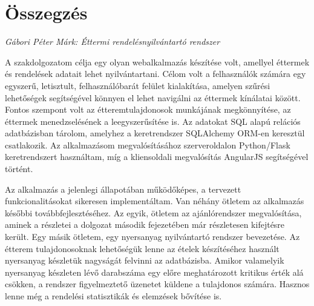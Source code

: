 \documentclass[a4paper,12pt]{article}
\begin{document}
\pagestyle{empty}

\section*{Összegzés}

\textit{Gábori Péter Márk: Éttermi rendelésnyilvántartó rendszer}

\bigskip

A szakdolgozatom célja egy olyan webalkalmazás készítése volt, amellyel éttermek és rendelések adatait lehet nyilvántartani. Célom volt a felhasználók számára egy egyszerű, letisztult, felhasználóbarát felület kialakítása, amelyen szűrési lehetőségek segítségével könnyen el lehet navigálni az éttermek kínálatai között. Fontos szempont volt az étteremtulajdonosok munkájának megkönnyítése, az éttermek menedzselésének a leegyszerűsítése is. Az adatokat SQL alapú relációs adatbázisban tárolom, amelyhez a keretrendszer SQLAlchemy ORM-en keresztül csatlakozik. Az alkalmazásom megvalósításához szerveroldalon Python/Flask keretrendszert használtam, míg a kliensoldali megvalósítás AngularJS segítségével történt.

Az alkalmazás a jelenlegi állapotában működőképes, a tervezett funkcionalitásokat sikeresen implementáltam. Van néhány ötletem az alkalmazás későbbi továbbfejlesztéséhez. Az egyik, ötletem az ajánlórendszer megvalósítása, aminek a részletei a dolgozat második fejezetében már részletesen kifejtésre került. Egy másik ötletem, egy nyersanyag nyilvántartó rendszer bevezetése. Az étterem tulajdonosoknak lehetőségük lenne az ételek készítéséhez használt nyersanyag készletük nagyságát felvinni az adatbázisba. Amikor valamelyik nyersanyag készleten lévő darabszáma egy előre meghatározott kritikus érték alá csökken, a rendszer figyelmeztető üzenetet küldene a tulajdonos számára. Hasznos lenne még a rendelési statisztikák és elemzések bővítése is.
\end{document}
